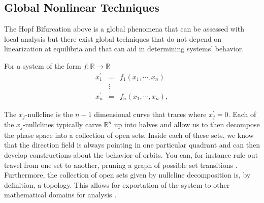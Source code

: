 \documentclass{elsart1p}
\begin{document}
\subsection{ Global Nonlinear Techniques }
The Hopf Bifurcation above is a global phenomena that can be assessed with
local analysis but there exist global techniques that do not depend on
linearization at equilibria and that can aid in determining systems' behavior.

For a system of the form $f : \mathbb{R} \rightarrow \mathbb{R}$
\[\begin{array}{ccc}
x_{1}^{\prime} & = & f_{1}(x_{1}, \cdots, x_{n}) \\
& \vdots & \\
x_{n}^{\prime} & = & f_{n}(x_{1}, \cdots, x_{n}), \end{array} \] 

The $x_{j}$-nullcline is the $n-1$ dimensional curve that traces 
where $x_{j}^{\prime} = 0$.  Each of the $x_{j}$-nullclines 
typically carve $\mathbb{R}^{n}$ up into halves
and allow us to then decompose the phase space into a collection of open sets.
Inside each of these sets, we know that the direction field is always pointing
in one particular quadrant and can then develop constructions about the behavior
of orbits.  You can, for instance rule out travel from one set to another, 
pruning a graph of possible set transitions \cite{hirsch}.  Furthermore, 
the collection of open sets given by nullcline decomposition is, by definition,
a topology.  This allows for exportation of the system to other mathematical
domains for analysis \cite{basener, arrowsmith}.
%
%


\end{document}
